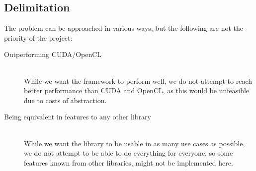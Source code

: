 \subsection{Delimitation}
The problem can be approached in various ways, but the following are not the priority of the project:

\begin{description}
\item[Outperforming CUDA/OpenCL] \hfill \\
While we want the framework to perform well, we do not attempt to reach better performance than CUDA and OpenCL, as this would be unfeasible due to costs of abstraction.
\item[Being equivalent in features to any other library] \hfill \\
While we want the library to be usable in as many use cases as possible, we do not attempt to be able to do everything for everyone, so some features known from other libraries, might not be implemented here.
\end{description}